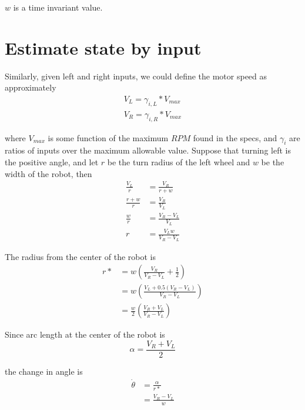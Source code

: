 \documentclass[11pt]{article}
\begin{document}
$w$ is a time invariant value.

\section{Estimate state by input}

Similarly, given left and right inputs, we could define the motor speed as approximately
\begin{align}
V_L = \gamma_{i, L} * V_{max} \\
V_R = \gamma_{i, R} * V_{max}
\end{align}

where $V_{max}$ is some function of the maximum $RPM$ found in the specs, and $\gamma_i$ are ratios of inputs over the maximum allowable value. Suppose that turning left is the positive angle, and let $r$ be the turn radius of the left wheel and $w$ be the width of the robot, then
\begin{equation}
\begin{split}
\frac{V_L}{r} & = \frac{V_R}{r+w} \\
\frac{r+w}{r} & = \frac{V_R}{V_L} \\
\frac{w}{r} & = \frac{V_R - V_L}{V_L} \\
r & = \frac{V_L w}{V_R - V_L}
\end{split}
\end{equation}

The radius from the center of the robot is
\begin{equation}
\begin{split}
r* & = w \left(\frac{V_R}{V_R - V_L} + \frac{1}{2}\right) \\
& = w \left(\frac{V_L + 0.5(V_R - V_L)}{V_R - V_L}\right) \\
& = \frac{w}{2} \left(\frac{V_R + V_L}{V_R - V_L}\right)
\end{split}
\end{equation}

Since arc length at the center of the robot is
\begin{equation}
\alpha = \frac{V_R + V_L}{2}
\end{equation}

the change in angle is
\begin{equation}
\begin{split}
\dot{\theta} & = \frac{\alpha}{r*} \\
& = \frac{V_R - V_L}{w}
\end{split}
\end{equation}
\end{document}
